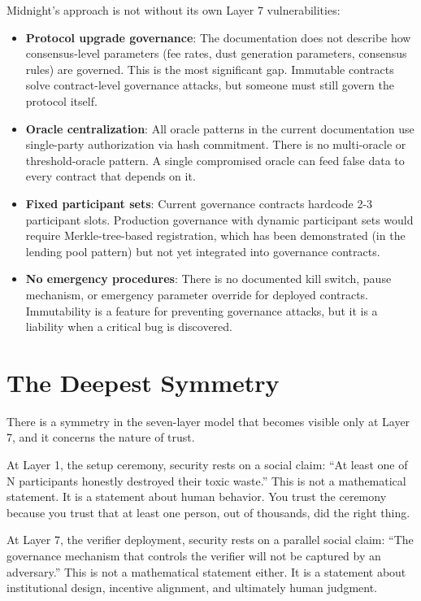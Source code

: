\documentclass[
  11pt,
  openany]{report}
\providecommand{\tightlist}{%
  \setlength{\itemsep}{0pt}\setlength{\parskip}{0pt}}
\renewcommand{\textbf}[1]{{\bfseries\color{MidnightBold}#1}}
\begin{document}
Midnight's approach is not without its own Layer 7 vulnerabilities:

\begin{itemize}
\tightlist
\item
  \textbf{Protocol upgrade governance}: The documentation does not describe how
  consensus-level parameters (fee rates, dust generation parameters, consensus
  rules) are governed. This is the most significant gap. Immutable contracts
  solve contract-level governance attacks, but someone must still govern the
  protocol itself.
\item
  \textbf{Oracle centralization}: All oracle patterns in the current
  documentation use single-party authorization via hash commitment. There is no
  multi-oracle or threshold-oracle pattern. A single compromised oracle can feed
  false data to every contract that depends on it.
\item
  \textbf{Fixed participant sets}: Current governance contracts hardcode 2-3
  participant slots. Production governance with dynamic participant sets would
  require Merkle-tree-based registration, which has been demonstrated (in the
  lending pool pattern) but not yet integrated into governance contracts.
\item
  \textbf{No emergency procedures}: There is no documented kill switch, pause
  mechanism, or emergency parameter override for deployed contracts.
  Immutability is a feature for preventing governance attacks, but it is a
  liability when a critical bug is discovered.
\end{itemize}

\section{The Deepest Symmetry}\label{the-deepest-symmetry}

There is a symmetry in the seven-layer model that becomes visible only at Layer
7, and it concerns the nature of trust.

At Layer 1, the setup ceremony, security rests on a social claim: ``At least one
of N participants honestly destroyed their toxic waste.'' This is not a
mathematical statement. It is a statement about human behavior. You trust the
ceremony because you trust that at least one person, out of thousands, did the
right thing.

At Layer 7, the verifier deployment, security rests on a parallel social claim:
``The governance mechanism that controls the verifier will not be captured by an
adversary.'' This is not a mathematical statement either. It is a statement
about institutional design, incentive alignment, and ultimately human judgment.
\end{document}
